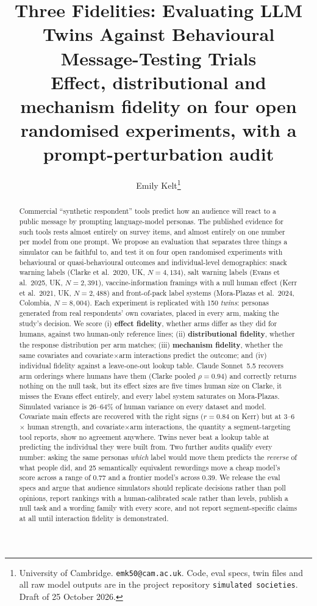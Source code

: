 \documentclass[10pt,twocolumn]{article}
\title{\vspace{-6mm}Three Fidelities: Evaluating LLM Twins Against Behavioural Message-Testing Trials\\[2mm]\large Effect, distributional and mechanism fidelity on four open randomised experiments, with a prompt-perturbation audit}
\author{Emily Kelt\thanks{University of Cambridge. \texttt{emk50@cam.ac.uk}. Code, eval specs, twin files and all raw model outputs are in the project repository \texttt{simulated societies}. Draft of 25 October 2026.}}
\date{}
\begin{document}
\maketitle

\begin{abstract}
Commercial ``synthetic respondent'' tools predict how an audience will react to a public message by prompting language-model personas. The published evidence for such tools rests almost entirely on survey items, and almost entirely on one number per model from one prompt. We propose an evaluation that separates three things a simulator can be faithful to, and test it on four open randomised experiments with behavioural or quasi-behavioural outcomes and individual-level demographics: snack warning labels (Clarke et al.\ 2020, UK, $N{=}4{,}134$), salt warning labels (Evans et al.\ 2025, UK, $N{=}2{,}391$), vaccine-information framings with a null human effect (Kerr et al.\ 2021, UK, $N{=}2{,}488$) and front-of-pack label systems (Mora-Plazas et al.\ 2024, Colombia, $N{=}8{,}004$). Each experiment is replicated with 150 \emph{twins}: personas generated from real respondents' own covariates, placed in every arm, making the study's decision. We score (i) \textbf{effect fidelity}, whether arms differ as they did for humans, against two human-only reference lines; (ii) \textbf{distributional fidelity}, whether the response distribution per arm matches; (iii) \textbf{mechanism fidelity}, whether the same covariates and covariate$\times$arm interactions predict the outcome; and (iv) individual fidelity against a leave-one-out lookup table. Claude Sonnet~5.5 recovers arm orderings where humans have them (Clarke pooled $\rho{=}0.94$) and correctly returns nothing on the null task, but its effect sizes are five times human size on Clarke, it misses the Evans effect entirely, and every label system saturates on Mora-Plazas. Simulated variance is 26--64\% of human variance on every dataset and model. Covariate main effects are recovered with the right signs ($r{=}0.84$ on Kerr) but at 3--6$\times$ human strength, and covariate$\times$arm interactions, the quantity a segment-targeting tool reports, show no agreement anywhere. Twins never beat a lookup table at predicting the individual they were built from. Two further audits qualify every number: asking the same personas \emph{which} label would move them predicts the \emph{reverse} of what people did, and 25 semantically equivalent rewordings move a cheap model's score across a range of 0.77 and a frontier model's across 0.39. We release the eval specs and argue that audience simulators should replicate decisions rather than poll opinions, report rankings with a human-calibrated scale rather than levels, publish a null task and a wording family with every score, and not report segment-specific claims at all until interaction fidelity is demonstrated.
\end{abstract}
\end{document}
